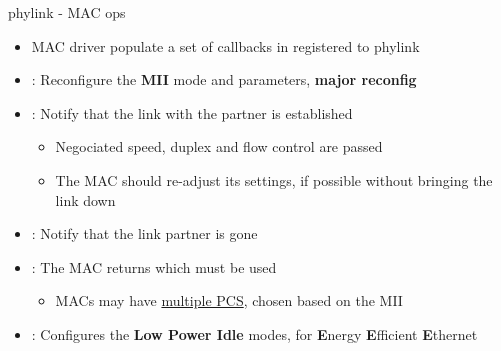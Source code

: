 \begin{frame}[fragile]{phylink - MAC ops}
	\begin{itemize}
		\item MAC driver populate a set of callbacks in  registered to phylink
		\item {} : Reconfigure the \textbf{MII} mode and parameters, \textbf{major reconfig}
		\item {} : Notify that the link with the partner is established
			\begin{itemize}
				\item Negociated speed, duplex and flow control are passed
				\item The MAC should re-adjust its settings, if possible without bringing the link down
			\end{itemize}
		\item {} : Notify that the link partner is gone
		\item {} : The MAC returns which  must be used
			\begin{itemize}
				\item MACs may have \href{https://elixir.bootlin.com/linux/v6.15.1/source/drivers/net/ethernet/marvell/mvpp2/mvpp2_main.c\#L6468}{multiple PCS}, chosen based on the MII
			\end{itemize}
		\item {} : Configures the \textbf{Low Power Idle} modes, for \textbf{E}nergy \textbf{E}fficient \textbf{E}thernet
	\end{itemize}
\end{frame}

